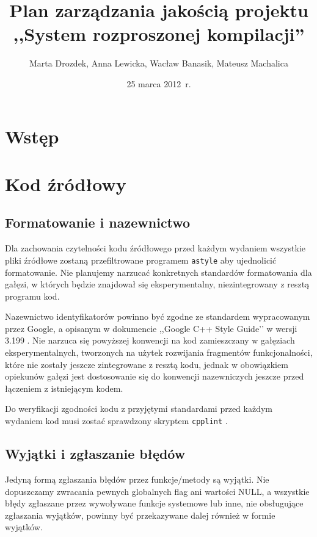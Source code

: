 \documentclass[a4paper]{article}
\title{Plan zarządzania jakością projektu ,,System rozproszonej kompilacji''}
\author{Marta Drozdek, Anna Lewicka, Wacław Banasik, Mateusz Machalica}
\date{25 marca 2012~r.}
\begin{document}
\maketitle

\section{Wstęp}



\section{Kod źródłowy}

\subsection{Formatowanie i nazewnictwo}

Dla zachowania czytelności kodu źródłowego przed każdym wydaniem wszystkie pliki źródłowe zostaną przefiltrowane programem \verb+astyle+ aby ujednolicić formatowanie. Nie planujemy narzucać konkretnych standardów formatowania dla gałęzi, w których będzie znajdował się eksperymentalny, niezintegrowany z resztą programu kod.

Nazewnictwo identyfikatorów powinno być zgodne ze standardem wypracowanym przez Google, a opisanym w dokumencie ,,Google C++ Style Guide’’ w wersji 3.199 \cite{googstyle}.
Nie narzuca się powyższej konwencji na kod zamieszczany w gałęziach eksperymentalnych, tworzonych na użytek rozwijania fragmentów funkcjonalności, które nie zostały jeszcze zintegrowane z resztą kodu, jednak w obowiązkiem opiekunów gałęzi jest dostosowanie się do konwencji nazewniczych jeszcze przed łączeniem z istniejącym kodem.

Do weryfikacji zgodności kodu z przyjętymi standardami przed każdym wydaniem kod musi zostać sprawdzony skryptem \verb+cpplint+ \cite{cpplint}.

\subsection{Wyjątki i zgłaszanie błędów}

Jedyną formą zgłaszania błędów przez funkcje/metody są wyjątki. Nie dopuszczamy zwracania pewnych globalnych flag ani wartości NULL, a wszystkie błędy zgłaszane przez wywoływane funkcje systemowe lub inne, nie obsługujące zgłaszania wyjątków, powinny być przekazywane dalej również w formie wyjątków.
\end{document}
